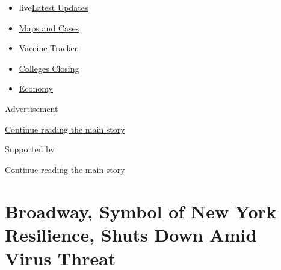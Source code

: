 \begin{itemize}
\tightlist
\item
  live\href{https://www.nytimes3xbfgragh.onion/2020/08/21/world/covid-19-coronavirus.html?name=styln-coronavirus-national\&region=TOP_BANNER\&variant=undefined\&block=storyline_menu_recirc\&action=click\&pgtype=Article\&impression_id=ab7b06d1-e3af-11ea-9f78-853988e69a14}{Latest
  Updates}
\item
  \href{https://www.nytimes3xbfgragh.onion/interactive/2020/us/coronavirus-us-cases.html?name=styln-coronavirus-national\&region=TOP_BANNER\&variant=undefined\&block=storyline_menu_recirc\&action=click\&pgtype=Article\&impression_id=ab7b2de0-e3af-11ea-9f78-853988e69a14}{Maps
  and Cases}
\item
  \href{https://www.nytimes3xbfgragh.onion/interactive/2020/science/coronavirus-vaccine-tracker.html?name=styln-coronavirus-national\&region=TOP_BANNER\&variant=undefined\&block=storyline_menu_recirc\&action=click\&pgtype=Article\&impression_id=ab7b2de1-e3af-11ea-9f78-853988e69a14}{Vaccine
  Tracker}
\item
  \href{https://www.nytimes3xbfgragh.onion/2020/08/19/us/colleges-closing-covid.html?name=styln-coronavirus-national\&region=TOP_BANNER\&variant=undefined\&block=storyline_menu_recirc\&action=click\&pgtype=Article\&impression_id=ab7b2de2-e3af-11ea-9f78-853988e69a14}{Colleges
  Closing}
\item
  \href{https://www.nytimes3xbfgragh.onion/live/2020/08/21/business/stock-market-today-coronavirus?name=styln-coronavirus-national\&region=TOP_BANNER\&variant=undefined\&block=storyline_menu_recirc\&action=click\&pgtype=Article\&impression_id=ab7b2de3-e3af-11ea-9f78-853988e69a14}{Economy}
\end{itemize}

Advertisement

\protect\hyperlink{after-top}{Continue reading the main story}

Supported by

\protect\hyperlink{after-sponsor}{Continue reading the main story}

\hypertarget{broadway-symbol-of-new-york-resilience-shuts-down-amid-virus-threat}{%
\section{Broadway, Symbol of New York Resilience, Shuts Down Amid Virus
Threat}\label{broadway-symbol-of-new-york-resilience-shuts-down-amid-virus-threat}}

